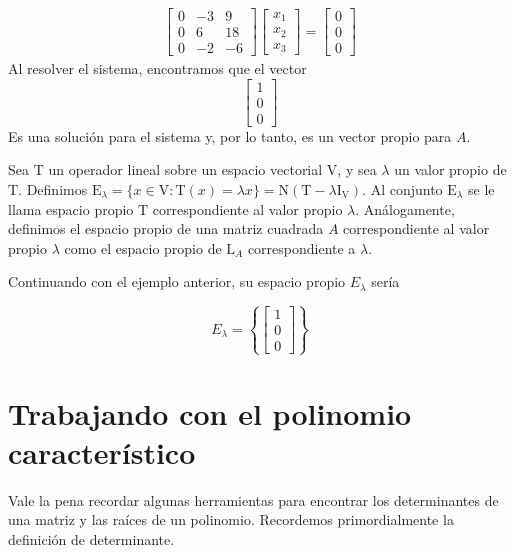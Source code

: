 \documentclass{report}
\begin{document}
\begin{Example}
        \begin{align*}
            \begin{bmatrix}
                0 & -3 & 9\\
                0 & 6 & 18\\
                0 & -2 & -6
            \end{bmatrix}
            \begin{bmatrix}
                x_1\\ x_2\\ x_3
            \end{bmatrix} = \begin{bmatrix}
                0\\0\\0
            \end{bmatrix}
        \end{align*}
        Al resolver el sistema, encontramos que el vector
        $$\begin{bmatrix}
            1\\0\\0
        \end{bmatrix}$$
        Es una solución para el sistema y, por lo tanto, es un vector propio para $A$.
    \end{Example}
    
    \begin{defBox}
        Sea $\mathrm{T}$ un operador lineal sobre un espacio vectorial $\mathrm{V}$, y sea $\lambda$ un valor propio de $\mathrm{T}$. Definimos $\mathrm{E}_\lambda=\{x \in \mathrm{V}: \mathrm{T}(x)=\lambda x\}=\mathrm{N}\left(\mathrm{T}-\lambda \mathrm{I}_{\mathrm{V}}\right)$. Al conjunto $\mathrm{E}_\lambda$ se le llama espacio propio $\mathrm{T}$ correspondiente al valor propio $\lambda$. Análogamente, definimos el espacio propio de una matriz cuadrada $A$ correspondiente al valor propio $\lambda$ como el espacio propio de $\mathrm{L}_A$ correspondiente a $\lambda$.
    \end{defBox}
    
    Continuando con el ejemplo anterior, su espacio propio $E_\lambda$ sería
    
    $$ E_\lambda = \left\{ \begin{bmatrix}1\\0\\0\end{bmatrix} \right\}$$
    
    \section{Trabajando con el polinomio característico}
    Vale la pena recordar algunas herramientas para encontrar los determinantes de una matriz y las raíces de un polinomio. Recordemos primordialmente la definición de determinante.
    
\end{document}
